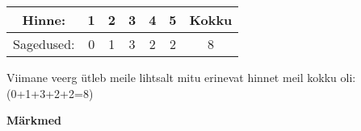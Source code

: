 \begin{center}
{{{\begin{flushleft}
\vspace{2mm}
\hspace{5mm}
\begin{tabular}{|c|c|c|c|c|c|c|}
	\hline
	Hinne: & 1 & 2 & 3 & 4 & 5 & Kokku\\
	\hline
	Sagedused: & 0 & 1 & 3 & 2 & 2 & 8\\
	\hline	
\end{tabular}

\vspace{2mm}
\hspace{5mm}
Viimane veerg ütleb meile lihtsalt mitu erinevat hinnet meil kokku oli: (0+1+3+2+2=8)
\end{flushleft}
}}}
\end{center}


\vspace{0.5cm}

\textbf{Märkmed}\\
\vspace{2mm}
\begin{mdframed}[style=graphpaper]
\vspace{9cm}
\end{mdframed}
